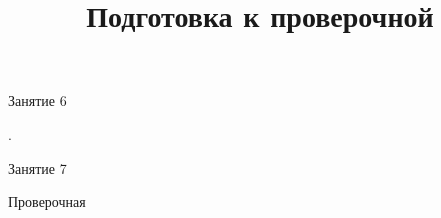 \begin{class}[number=6]
	\begin{listofex}
		\item Занятие 6
	\end{listofex}
\end{class}

\begin{homework}[number=3]
	\begin{listofex}
		\item .
	\end{listofex}
\end{homework}

\begin{class}[number=7]
	\title{Подготовка к проверочной}
	\begin{listofex}
		\item Занятие 7
	\end{listofex}
\end{class}

\begin{exam}
	\begin{listofex}
		\item Проверочная
	\end{listofex}
\end{exam}
